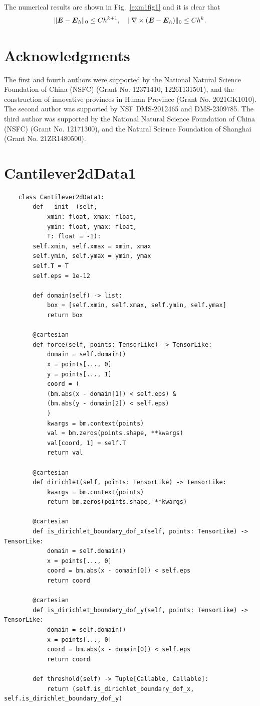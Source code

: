 \documentclass[mathpazo]{cicp}
\begin{document}
The numerical results are shown in Fig.~\ref{exm1fig1} and it is clear that 
$$
\|\boldsymbol E-\boldsymbol E_h\|_{0} \leq C h^{k+1}, \quad \|\nabla\times(\boldsymbol E-\boldsymbol E_h)\|_{0} \leq C h^k.
$$


\section*{Acknowledgments}
The first and fourth authors were supported by the National Natural Science
Foundation of China (NSFC) (Grant No. 12371410, 12261131501), and the
construction of innovative provinces in Hunan Province (Grant No. 2021GK1010).
The second author was supported by NSF DMS-2012465 and DMS-2309785. The third
author was supported by the National Natural Science Foundation of China (NSFC)
(Grant No. 12171300), and the Natural Science Foundation of Shanghai (Grant No.
21ZR1480500).

\appendix
\renewcommand{\thesection}{Appendix\,\Alph{section}.}
\section{Cantilever2dData1}
\label{sec:canti}
\begin{lstlisting}
	class Cantilever2dData1:
		def __init__(self, 
			xmin: float, xmax: float, 
			ymin: float, ymax: float,
			T: float = -1):
		self.xmin, self.xmax = xmin, xmax
		self.ymin, self.ymax = ymin, ymax
		self.T = T 
		self.eps = 1e-12
		
		def domain(self) -> list:
			box = [self.xmin, self.xmax, self.ymin, self.ymax]
			return box
		
		@cartesian
		def force(self, points: TensorLike) -> TensorLike:
			domain = self.domain()
			x = points[..., 0]
			y = points[..., 1]
			coord = (
			(bm.abs(x - domain[1]) < self.eps) & 
			(bm.abs(y - domain[2]) < self.eps)
			)
			kwargs = bm.context(points)
			val = bm.zeros(points.shape, **kwargs)
			val[coord, 1] = self.T
			return val
		
		@cartesian
		def dirichlet(self, points: TensorLike) -> TensorLike:
			kwargs = bm.context(points)
			return bm.zeros(points.shape, **kwargs)
		
		@cartesian
		def is_dirichlet_boundary_dof_x(self, points: TensorLike) -> TensorLike:
			domain = self.domain()
			x = points[..., 0]
			coord = bm.abs(x - domain[0]) < self.eps
			return coord
		
		@cartesian
		def is_dirichlet_boundary_dof_y(self, points: TensorLike) -> TensorLike:
			domain = self.domain()
			x = points[..., 0]
			coord = bm.abs(x - domain[0]) < self.eps
			return coord    
		
		def threshold(self) -> Tuple[Callable, Callable]:
			return (self.is_dirichlet_boundary_dof_x, self.is_dirichlet_boundary_dof_y)
\end{lstlisting}
\end{document}
